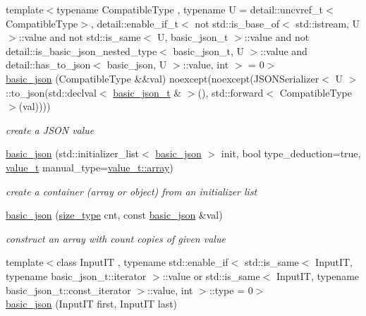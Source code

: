 \begin{DoxyCompactItemize}
{\footnotesize template$<$typename Compatible\+Type , typename U  = detail\+::uncvref\+\_\+t$<$\+Compatible\+Type$>$, detail\+::enable\+\_\+if\+\_\+t$<$ not std\+::is\+\_\+base\+\_\+of$<$ std\+::istream, U $>$\+::value and not std\+::is\+\_\+same$<$ U, basic\+\_\+json\+\_\+t $>$\+::value and not detail\+::is\+\_\+basic\+\_\+json\+\_\+nested\+\_\+type$<$ basic\+\_\+json\+\_\+t, U $>$\+::value and detail\+::has\+\_\+to\+\_\+json$<$ basic\+\_\+json, U $>$\+::value, int $>$  = 0$>$ }\\\mbox{\hyperlink{classnlohmann_1_1basic__json_a7639e0834df2bc719a04ffea89b31abc}{basic\+\_\+json}} (Compatible\+Type \&\&val) noexcept(noexcept(J\+S\+O\+N\+Serializer$<$ U $>$\+::to\+\_\+json(std\+::declval$<$ \mbox{\hyperlink{classnlohmann_1_1basic__json}{basic\+\_\+json\+\_\+t}} \& $>$(), std\+::forward$<$ Compatible\+Type $>$(val))))
\begin{DoxyCompactList}\small\item\em create a J\+S\+ON value \end{DoxyCompactList}\item 
\mbox{\hyperlink{classnlohmann_1_1basic__json_afbad48316e7cd37366ba3ac5d7e5859e}{basic\+\_\+json}} (std\+::initializer\+\_\+list$<$ \mbox{\hyperlink{classnlohmann_1_1basic__json}{basic\+\_\+json}} $>$ init, bool type\+\_\+deduction=true, \mbox{\hyperlink{namespacenlohmann_1_1detail_a90aa5ef615aa8305e9ea20d8a947980f}{value\+\_\+t}} manual\+\_\+type=\mbox{\hyperlink{namespacenlohmann_1_1detail_a90aa5ef615aa8305e9ea20d8a947980faf1f713c9e000f5d3f280adbd124df4f5}{value\+\_\+t\+::array}})
\begin{DoxyCompactList}\small\item\em create a container (array or object) from an initializer list \end{DoxyCompactList}\item 
\mbox{\hyperlink{classnlohmann_1_1basic__json_ab6816ae5100409254ed0a8bc21c387bb}{basic\+\_\+json}} (\mbox{\hyperlink{classnlohmann_1_1basic__json_a39f2cd0b58106097e0e67bf185cc519b}{size\+\_\+type}} cnt, const \mbox{\hyperlink{classnlohmann_1_1basic__json}{basic\+\_\+json}} \&val)
\begin{DoxyCompactList}\small\item\em construct an array with count copies of given value \end{DoxyCompactList}\item 
{\footnotesize template$<$class Input\+IT , typename std\+::enable\+\_\+if$<$ std\+::is\+\_\+same$<$ Input\+I\+T, typename basic\+\_\+json\+\_\+t\+::iterator $>$\+::value or std\+::is\+\_\+same$<$ Input\+I\+T, typename basic\+\_\+json\+\_\+t\+::const\+\_\+iterator $>$\+::value, int $>$\+::type  = 0$>$ }\\\mbox{\hyperlink{classnlohmann_1_1basic__json_abe197e9f3184487805cfb5bba6fd5938}{basic\+\_\+json}} (Input\+IT first, Input\+IT last)

\end{DoxyCompactItemize}
